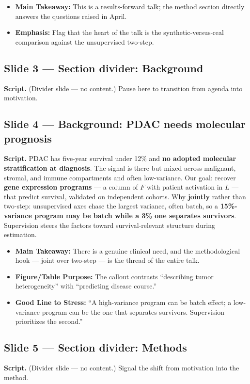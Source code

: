 \documentclass[11pt]{article}
\newcommand{\scriptlabel}{\textbf{Script. }}
\newcommand{\sectionlabel}[1]{\textbf{#1}}
\newcommand{\key}[1]{\textcolor{keyblue}{\textbf{#1}}}        %
\begin{document}
\begin{itemize}
\item \sectionlabel{Main Takeaway:} This is a results-forward talk; the method section directly
answers the questions raised in April.
\item \sectionlabel{Emphasis:} Flag that the heart of the talk is the synthetic-versus-real
comparison against the unsupervised two-step.
\end{itemize}

\subsection*{Slide 3 --- Section divider: Background}
\scriptlabel (Divider slide --- no content.) Pause here to transition from agenda into motivation.

\subsection*{Slide 4 --- Background: PDAC needs molecular prognosis}
\scriptlabel PDAC has five-year survival under 12\% and \key{no adopted molecular stratification at
diagnosis}. The signal is there but mixed across malignant, stromal, and immune compartments and
often low-variance. Our goal: recover \key{gene expression programs} --- a column of $F$ with
patient activation in $L$ --- that predict survival, validated on independent cohorts. Why
\key{jointly} rather than two-step: unsupervised axes chase the largest variance, often batch, so a
\key{15\%-variance program may be batch while a 3\% one separates survivors}. Supervision steers the
factors toward survival-relevant structure during estimation.

\begin{itemize}
\item \sectionlabel{Main Takeaway:} There is a genuine clinical need, and the methodological hook
--- joint over two-step --- is the thread of the entire talk.
\item \sectionlabel{Figure/Table Purpose:} The callout contrasts ``describing tumor heterogeneity''
with ``predicting disease course.''
\item \sectionlabel{Good Line to Stress:} ``A high-variance program can be batch effect; a
low-variance program can be the one that separates survivors. Supervision prioritizes the second.''
\end{itemize}

\subsection*{Slide 5 --- Section divider: Methods}
\scriptlabel (Divider slide --- no content.) Signal the shift from motivation into the method.
\end{document}
